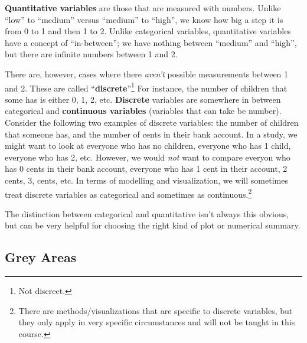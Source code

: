 \documentclass[
  letterpaper,
  DIV=11,
  numbers=noendperiod,
  oneside]{scrreprt}
\begin{document}
\textbf{Quantitative variables} are those that are measured with
numbers. Unlike ``low'' to ``medium'' versus ``medium'' to ``high'', we
know how big a step it is from 0 to 1 and then 1 to 2. Unlike
categorical variables, quantitative variables have a concept of
``in-between''; we have nothing between ``medium'' and ``high'', but
there are infinite numbers between 1 and
2.{}

There are, however, cases where there \emph{aren't} possible
measurements between 1 and 2. These are called
``\textbf{discrete}''\footnote{Not discreet.} For instance, the number
of children that some has is either 0, 1, 2, etc. \textbf{Discrete}
variables are somewhere in between categorical and \textbf{continuous
variables} (variables that can take be number). Consider the following
two examples of discrete variables: the number of children that someone
has, and the number of cents in their bank account. In a study, we might
want to look at everyone who has no children, everyone who has 1 child,
everyone who has 2, etc. However, we would \emph{not} want to compare
everyon who has 0 cents in their bank account, everyone who has 1 cent
in their account, 2 cents, 3, cents, etc. In terms of modelling and
visualization, we will sometimes treat discrete variables as categorical
and sometimes as
continuous.\footnote{There are methods/visualizations that are specific
  to discrete variables, but they only apply in very specific
  circumstances and will not be taught in this course.}{}
{}

The distinction between categorical and quantitative isn't always this
obvious, but can be very helpful for choosing the right kind of plot or
numerical summary.

\hypertarget{grey-areas}{%
\subsection{Grey Areas}\label{grey-areas}}
\end{document}
